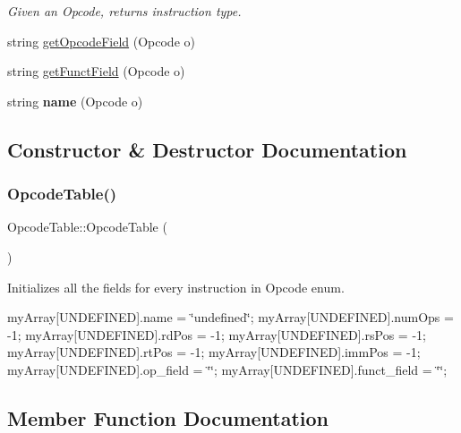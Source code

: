 \begin{DoxyCompactItemize}
\begin{DoxyCompactList}\small\item\em Given an Opcode, returns instruction type. \end{DoxyCompactList}\item 
string \mbox{\hyperlink{class_opcode_table_af89738c82bb2406fa8eadf1639a86218}{get\+Opcode\+Field}} (Opcode o)
\item 
string \mbox{\hyperlink{class_opcode_table_ad535fbf9bee4c19a165c94b235daed00}{get\+Funct\+Field}} (Opcode o)
\item 
\mbox{\label{class_opcode_table_a4021673f3dcfc1ef29fa4d7777838c96}} 
string {\bfseries name} (Opcode o)
\end{DoxyCompactItemize}


\subsection{Constructor \& Destructor Documentation}
\mbox{\label{class_opcode_table_acb286fdd22f1781abfb0d820b1f345aa}} 
\subsubsection{\texorpdfstring{Opcode\+Table()}{OpcodeTable()}}
{\footnotesize\ttfamily Opcode\+Table\+::\+Opcode\+Table (\begin{DoxyParamCaption}{ }\end{DoxyParamCaption})}



Initializes all the fields for every instruction in Opcode enum. 

my\+Array\mbox{[}U\+N\+D\+E\+F\+I\+N\+ED\mbox{]}.name = \char`\"{}undefined\char`\"{}; my\+Array\mbox{[}U\+N\+D\+E\+F\+I\+N\+ED\mbox{]}.num\+Ops = -\/1; my\+Array\mbox{[}U\+N\+D\+E\+F\+I\+N\+ED\mbox{]}.rd\+Pos = -\/1; my\+Array\mbox{[}U\+N\+D\+E\+F\+I\+N\+ED\mbox{]}.rs\+Pos = -\/1; my\+Array\mbox{[}U\+N\+D\+E\+F\+I\+N\+ED\mbox{]}.rt\+Pos = -\/1; my\+Array\mbox{[}U\+N\+D\+E\+F\+I\+N\+ED\mbox{]}.imm\+Pos = -\/1; my\+Array\mbox{[}U\+N\+D\+E\+F\+I\+N\+ED\mbox{]}.op\+\_\+field = \char`\"{}\char`\"{}; my\+Array\mbox{[}U\+N\+D\+E\+F\+I\+N\+ED\mbox{]}.funct\+\_\+field = \char`\"{}\char`\"{}; 

\subsection{Member Function Documentation}
\mbox{\label{class_opcode_table_ad535fbf9bee4c19a165c94b235daed00}} 
